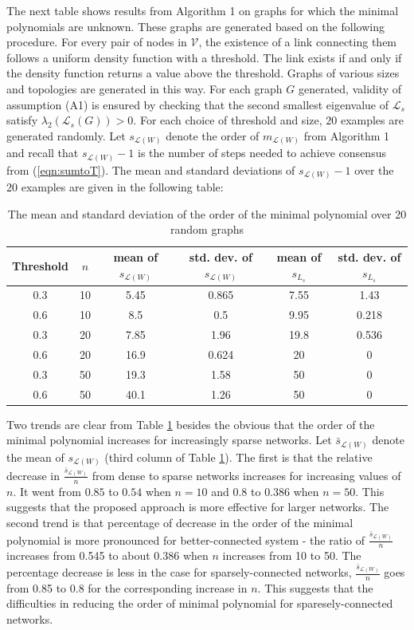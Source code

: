 \documentclass[onecolumn,reviewcopy]{autart}
\def \L{\mathcal{L}}
\def \V{\mathcal{V}}
\begin{document}
The next table shows results from Algorithm 1 on graphs for which the minimal polynomials are unknown. These graphs are generated based on the following procedure. For every pair of nodes in $\V$, the existence of a link connecting them follows a uniform density function with a threshold. The link exists if and only if the density function returns a value above the threshold.  Graphs of various sizes and topologies are generated in this way. For each graph $G$ generated, validity of assumption (A1) is ensured by checking that the second smallest eigenvalue of $\L_s$ satisfy $\lambda_2 (\L_s(G)) >0$. For each choice of threshold and size, $20$ examples are generated randomly. Let $s_{\L(W)}$ denote the order of $m_{\L(W)}$ from Algorithm 1 and recall that $s_{\L(W)}-1$ is the number of steps needed to achieve consensus from (\ref{eqn:sumtoT}). The mean and standard deviations of $s_{\L(W)}-1$ over the 20 examples are given in the following table:
\begin{table}[H]
\begin{center}
\begin{tabular}{|c|c|c|c|c|c|}
  \hline
  Threshold & $n$ & mean of $s_{\L(W)}$ & std. dev. of $s_{\L(W)}$ & mean of $s_{L_s}$ & std. dev. of $s_{L_s}$ \\
  \hline
  0.3 & 10 & 5.45  & 0.865 & 7.55 & 1.43\\
  0.6 & 10 & 8.5  & 0.5 & 9.95 & 0.218\\
  \hline
  0.3 & 20 & 7.85 & 1.96 & 19.8 & 0.536\\
  0.6 & 20 & 16.9 & 0.624 & 20 & 0\\
  \hline
  0.3 & 50 & 19.3 & 1.58 & 50 & 0\\
  0.6 & 50 & 40.1 & 1.26 & 50 & 0\\
  \hline
\end{tabular}
\caption{The mean and standard deviation of the order of the minimal polynomial over 20 random graphs} \label{tab:2}
\end{center}
\end{table}


Two trends are clear from Table \ref{tab:2} besides the obvious that the order of the minimal polynomial increases for increasingly sparse networks. Let $\bar{s}_{{\L(W)}}$ denote the mean of $s_{\L(W)}$ (third column of Table \ref{tab:2}). The first is that the relative decrease in  $\frac{\bar{s}_{\L(W)}}{n}$ from dense to sparse networks increases for increasing values of $n$. It went from $0.85$ to $0.54$ when $n=10$ and $0.8$ to $0.386$ when $n=50$. This suggests that the proposed approach is more effective for larger networks. The second trend is that percentage of decrease in the order of the minimal polynomial is more pronounced for better-connected system - the ratio of $\frac{\bar{s}_{\L(W)}}{n}$ increases from 0.545 to about 0.386 when $n$ increases from 10 to 50. The percentage decrease is less in the case for sparsely-connected networks, $\frac{\bar{s}_{\L(W)}}{n}$ goes from 0.85 to 0.8 for the corresponding increase in $n$. This suggests that the difficulties in reducing the order of minimal polynomial for sparesely-connected networks.
\end{document}
